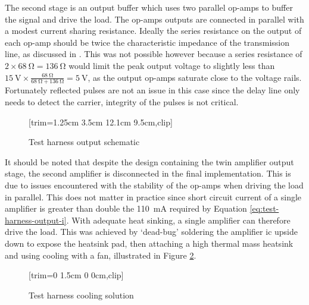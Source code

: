 The second stage is an output buffer which uses two parallel op-amps to buffer the signal and drive the load. The op-amps outputs are connected in parallel with a modest current sharing resistance. Ideally the series resistance on the output of each op-amp should be twice the characteristic impedance of the transmission line, as discussed in \cite{intersil2005}. This was not possible however because a series resistance of $2 \times \SI{68}{\ohm} = \SI{136}{\ohm}$ would limit the peak output voltage to slightly less than $\SI{15}{\volt} \times \frac{\SI{68}{\ohm}}{\SI{68}{\ohm} + \SI{136}{\ohm}} = \SI{5}{\volt}$, as the output op-amps saturate close to the voltage rails. Fortunately reflected pulses are not an issue in this case since the delay line only needs to detect the carrier, integrity of the pulses is not critical.

\begin{figure}[ht]
	\centering
	[trim={1.25cm 3.5cm 12.1cm 9.5cm},clip] %
	\caption{Test harness output schematic}
	\label{fig:test-harness-output-sch}
\end{figure}

It should be noted that despite the design containing the twin amplifier output stage, the second amplifier is disconnected in the final implementation. This is due to issues encountered with the stability of the op-amps when driving the load in parallel. This does not matter in practice since short circuit current of a single amplifier is greater than double the \SI{110}{\milli\ampere} required by Equation \ref{eq:test-harness-output-i}. With adequate heat sinking, a single amplifier can therefore drive the load. This was achieved by `dead-bug' soldering the amplifier \gls{ic} upside down to expose the heatsink pad, then attaching a high thermal mass heatsink and using cooling with a fan, illustrated in Figure \ref{fig:test-harness-heatsink}.

\begin{figure}[ht]
	\centering
	[trim={0 1.5cm 0 0cm},clip] %
	\caption{Test harness cooling solution}
	\label{fig:test-harness-heatsink}
\end{figure}


\chapter{} \label{sec:verification}

